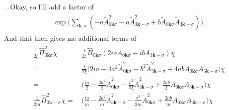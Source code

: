 \documentclass{report}
\begin{document}
.\,.\,Okay, so I'll add a factor of
\begin{align}
\begin{aligned}
	\exp\Big(
		\sum_{\boldsymbol{k}, \sigma}(
			- a\tilde A_{0\boldsymbol{k}\sigma}^2  
			- a\tilde A_{3\boldsymbol{k}-\sigma}^2
			+ b \tilde A_{0\boldsymbol{k}\sigma} 
				\tilde A_{3\boldsymbol{k}-\sigma} 
		)
	\Big).
\end{aligned}
\end{align}
And that then gives me additional terms of
\begin{align}
\begin{aligned}
	\frac{1}{2\xi} \hat \Pi_{0\boldsymbol{k}\sigma}^2 
	\chi =&\,
	\frac{1}{2\xi} \hat \Pi_{0\boldsymbol{k}\sigma}(
		2 i a A_{0\boldsymbol{k}\sigma} -
		i b A_{3\boldsymbol{k}-\sigma}
	) \chi \\=&\,
	\frac{1}{2\xi}
	\Big(
		2i a -
		4 a^2 \tilde A_{0\boldsymbol{k}\sigma}^2 -
		b^2 \tilde A_{3\boldsymbol{k}-\sigma}^2 +
		4 a b A_{0\boldsymbol{k}\sigma}A_{3\boldsymbol{k}-\sigma}
	\Big) \chi \\=&\,
	\Big(
		\frac{i a}{\xi} -
		\frac{2 a^2}{\xi} \tilde A_{0\boldsymbol{k}\sigma}^2 -
		\frac{b^2}{2\xi} \tilde A_{3\boldsymbol{k}-\sigma}^2 +
		\frac{2 a b}{\xi} A_{0\boldsymbol{k}\sigma}A_{3\boldsymbol{k}-\sigma}
	\Big) \chi \\
	\frac{1}{2\tilde m} \hat \Pi_{3\boldsymbol{k}-\sigma}^2 
	\chi =&\,
	\Big(
		\frac{i a}{\tilde m} -
		\frac{2 a^2}{\tilde m} \tilde A_{3\boldsymbol{k}-\sigma}^2 -
		\frac{b^2}{2\tilde m} \tilde A_{0\boldsymbol{k}\sigma}^2 +
		\frac{2 a b}{\tilde m} A_{0\boldsymbol{k}\sigma}A_{3\boldsymbol{k}-\sigma}
	\Big) \chi \\
\end{aligned}
\end{align}
\end{document}
